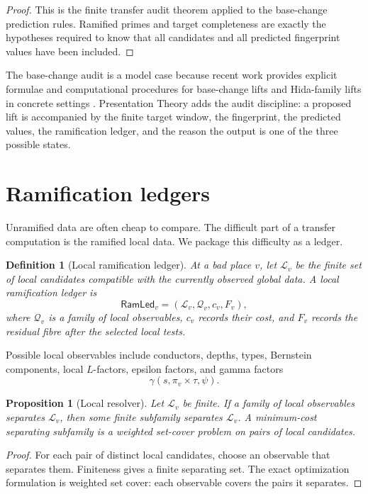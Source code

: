 \documentclass[11pt]{article}
\newtheorem{proposition}[theorem]{Proposition}
\newtheorem{definition}[theorem]{Definition}
\begin{document}
\begin{proof}
This is the finite transfer audit theorem applied to the base-change prediction rules.  Ramified primes and target completeness are exactly the hypotheses required to know that all candidates and all predicted fingerprint values have been included.
\end{proof}

The base-change audit is a model case because recent work provides explicit formulae and computational procedures for base-change lifts and Hida-family lifts in concrete settings \cite{basechange2026}.  Presentation Theory adds the audit discipline: a proposed lift is accompanied by the finite target window, the fingerprint, the predicted values, the ramification ledger, and the reason the output is one of the three possible states.

\section{Ramification ledgers}

Unramified data are often cheap to compare.  The difficult part of a transfer computation is the ramified local data.  We package this difficulty as a ledger.

\begin{definition}[Local ramification ledger]
At a bad place \(v\), let \(\mathcal L_v\) be the finite set of local candidates compatible with the currently observed global data.  A local ramification ledger is
\[
\mathsf{RamLed}_v=
(\mathcal L_v,\mathcal Q_v,c_v,F_v),
\]
where \(\mathcal Q_v\) is a family of local observables, \(c_v\) records their cost, and \(F_v\) records the residual fibre after the selected local tests.
\end{definition}

Possible local observables include conductors, depths, types, Bernstein components, local \(L\)-factors, epsilon factors, and gamma factors
\[
\gamma(s,\pi_v\times\tau,\psi).
\]

\begin{proposition}[Local resolver]
Let \(\mathcal L_v\) be finite.  If a family of local observables separates \(\mathcal L_v\), then some finite subfamily separates \(\mathcal L_v\).  A minimum-cost separating subfamily is a weighted set-cover problem on pairs of local candidates.
\end{proposition}

\begin{proof}
For each pair of distinct local candidates, choose an observable that separates them.  Finiteness gives a finite separating set.  The exact optimization formulation is weighted set cover: each observable covers the pairs it separates.
\end{proof}
\end{document}
